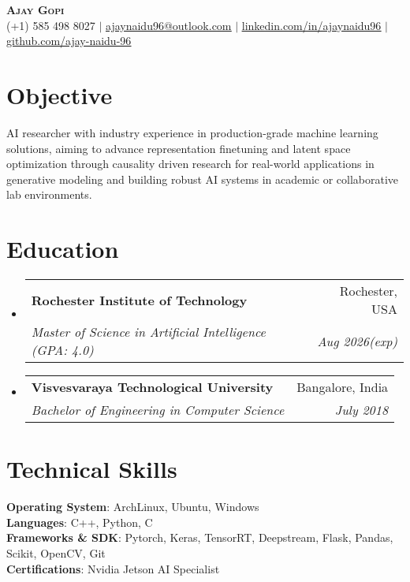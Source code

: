 \documentclass[letterpaper,10pt]{article}
\makeatletter
\newcommand{\resumeSubheading}[4]{
  \vspace{-2pt}\item
    \begin{tabular*}{0.97\textwidth}[t]{l@{\extracolsep{\fill}}r}
      \textbf{#1} & #2 \\
      \textit{\small#3} & \textit{\small #4} \\
    \end{tabular*}\vspace{-7pt}
}
\newcommand{\resumeSubHeadingListStart}{\begin{itemize}[leftmargin=0.15in, label={}]}
\newcommand{\resumeSubHeadingListEnd}{\end{itemize}}
\makeatother
\begin{document}
\begin{center}
    \textbf{\Huge \scshape Ajay Gopi} \\ \vspace{1pt}
    \small (+1) 585 498 8027 $|$ \href{mailto:ajaynaidu96@outlook.com}{\underline{ajaynaidu96@outlook.com}} $|$ 
    \href{https://www.linkedin.com/in/ajaynaidu96/}{\underline{linkedin.com/in/ajaynaidu96}} $|$
    \href{https://github.com/ajay-naidu-96/}{\underline{github.com/ajay-naidu-96}}
\end{center}


\section{Objective}
AI researcher with industry experience in production-grade machine learning solutions, aiming to advance representation finetuning and latent space optimization through causality driven research for real-world applications in generative modeling and building robust AI systems in academic or collaborative lab environments.

\section{Education}
\resumeSubHeadingListStart
  \resumeSubheading
    {Rochester Institute of Technology}{Rochester, USA}
    {Master of Science in Artificial Intelligence (GPA: 4.0)}{Aug 2026(exp)}
  \resumeSubheading
    {Visvesvaraya Technological University}{Bangalore, India}
    {Bachelor of Engineering in Computer Science}{July 2018}
\resumeSubHeadingListEnd

  \section{Technical Skills}
    \begin{itemize}[leftmargin=0.15in, label={}]
      \small{\item{
      \textbf{Operating System}{: ArchLinux, Ubuntu, Windows} \\
      \textbf{Languages}{: C++, Python, C} \\
      \textbf{Frameworks \& SDK}{: Pytorch, Keras, TensorRT, Deepstream, Flask, Pandas, Scikit, OpenCV, Git} \\
      \textbf{Certifications}{: Nvidia Jetson AI Specialist}
      }}
    \end{itemize}
\end{document}
